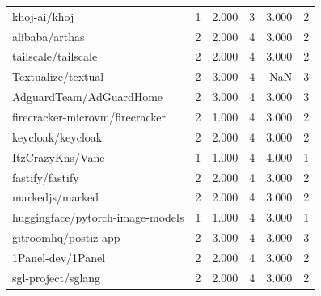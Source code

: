 \begin{tabular}{lrrrrr}
khoj-ai/khoj & 1 & 2.000 & 3 & 3.000 & 2 \\
alibaba/arthas & 2 & 2.000 & 4 & 3.000 & 2 \\
tailscale/tailscale & 2 & 2.000 & 4 & 3.000 & 2 \\
Textualize/textual & 2 & 3.000 & 4 & NaN & 3 \\
AdguardTeam/AdGuardHome & 2 & 3.000 & 4 & 3.000 & 3 \\
firecracker-microvm/firecracker & 2 & 1.000 & 4 & 3.000 & 2 \\
keycloak/keycloak & 2 & 2.000 & 4 & 3.000 & 2 \\
ItzCrazyKns/Vane & 1 & 1.000 & 4 & 4.000 & 1 \\
fastify/fastify & 2 & 2.000 & 4 & 3.000 & 2 \\
markedjs/marked & 2 & 2.000 & 4 & 3.000 & 2 \\
huggingface/pytorch-image-models & 1 & 1.000 & 4 & 3.000 & 1 \\
gitroomhq/postiz-app & 2 & 3.000 & 4 & 3.000 & 3 \\
1Panel-dev/1Panel & 2 & 2.000 & 4 & 3.000 & 2 \\
sgl-project/sglang & 2 & 2.000 & 4 & 3.000 & 2 \\
\bottomrule
\end{tabular}
